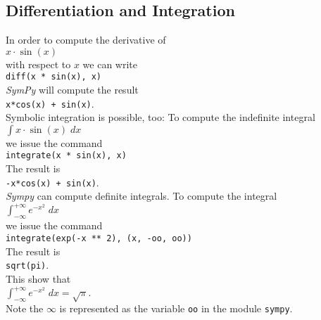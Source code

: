 \documentclass{article}
\begin{document}
\subsection{Differentiation and Integration}
In order to compute the derivative of
\\[0.2cm]
\hspace*{1.3cm}
$x \cdot \sin(x)$
\\[0.2cm]
with respect to $x$ we can write
\\[0.2cm]
\hspace*{1.3cm}
\texttt{diff(x * sin(x), x)}
\\[0.2cm]
\textsl{SymPy} will compute the result
\\[0.2cm]
\hspace*{1.3cm}
\texttt{x*cos(x) + sin(x)}.
\\[0.2cm]
Symbolic integration is possible, too:  To compute the indefinite integral
\\[0.2cm]
\hspace*{1.3cm}
$\displaystyle\int x \cdot \sin(x)\; dx$
\\[0.2cm]
we issue the command
\\[0.2cm]
\hspace*{1.3cm}
\texttt{integrate(x * sin(x), x)}
\\[0.2cm]
The result is
\\[0.2cm]
\hspace*{1.3cm}
\texttt{-x*cos(x) + sin(x)}.
\\[0.2cm]
\textsl{Sympy} can compute definite integrals.  To compute the integral
\\[0.2cm]
\hspace*{1.3cm}
$\displaystyle\int_{-\infty}^{+\infty} e^{-x^2} \; dx$
\\[0.2cm]
we issue the command
\\[0.2cm]
\hspace*{1.3cm}
\texttt{integrate(exp(-x ** 2), (x, -oo, oo))}
\\[0.2cm]
The result is
\\[0.2cm]
\hspace*{1.3cm}
\texttt{sqrt(pi)}.
\\[0.2cm]
This show that
\\[0.2cm]
\hspace*{1.3cm}
$\displaystyle\int_{-\infty}^{+\infty} e^{-x^2} \; dx = \sqrt{\pi}$.
\\[0.2cm]
Note the $\infty$ is represented as the variable \texttt{oo} in the module \texttt{sympy}.  
\end{document}
